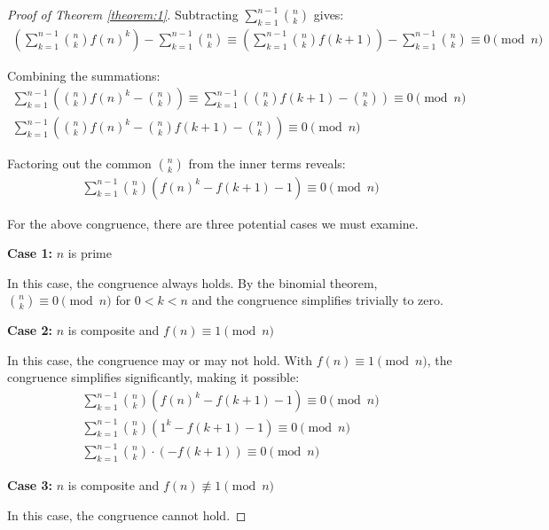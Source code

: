 \documentclass{article}
\theoremstyle{plain}
\theoremstyle{definition}
\begin{document}
\begin{proof}[Proof of Theorem \ref{theorem:1}]
Subtracting $\sum_{k=1}^{n-1} \binom{n}{k}$ gives:
\begin{align}
\left(\sum_{k=1}^{n-1} \binom{n}{k} f(n)^k\right) - \sum_{k=1}^{n-1} \binom{n}{k} \equiv \left(\sum_{k=1}^{n-1} \binom{n}{k} f(k+1)\right) - \sum_{k=1}^{n-1} \binom{n}{k} \equiv 0 \pmod{n}
\end{align}

Combining the summations:
\begin{align}
\sum_{k=1}^{n-1} \left(\binom{n}{k} f(n)^k - \binom{n}{k}\right) \equiv \sum_{k=1}^{n-1} \left(\binom{n}{k} f(k+1) - \binom{n}{k}\right) \equiv 0 \pmod{n} \\
\sum_{k=1}^{n-1} \left(\binom{n}{k} f(n)^k - \binom{n}{k} f(k+1) - \binom{n}{k}\right) \equiv 0 \pmod{n}
\end{align}

Factoring out the common $\binom{n}{k}$ from the inner terms reveals:
\begin{align}
\sum_{k=1}^{n-1} \binom{n}{k} \left(f(n)^k - f(k+1) - 1\right) \equiv 0 \pmod{n}
\end{align}

For the above congruence, there are three potential cases we must examine.

\textbf{Case 1:} $n$ is prime
    
In this case, the congruence always holds. By the binomial theorem, $\binom{n}{k} \equiv 0 \pmod{n}$ for $0 < k < n$ and the congruence simplifies trivially to zero.

\textbf{Case 2:} $n$ is composite and $f(n) \equiv 1 \pmod{n}$

In this case, the congruence may or may not hold. With $f(n) \equiv 1 \pmod{n}$, the congruence simplifies significantly, making it possible:
\begin{align}
    \sum_{k=1}^{n-1} \binom{n}{k} \left(f(n)^k - f(k+1) - 1\right) \equiv 0 \pmod{n} \\
    \sum_{k=1}^{n-1} \binom{n}{k} \left(1^k - f(k+1) - 1\right) \equiv 0 \pmod{n} \\
    \sum_{k=1}^{n-1} \binom{n}{k} \cdot \left(-f(k+1)\right) \equiv 0 \pmod{n}
\end{align}

\textbf{Case 3:} $n$ is composite and $f(n) \not\equiv 1 \pmod{n}$

In this case, the congruence cannot hold.


\end{proof}
\end{document}
